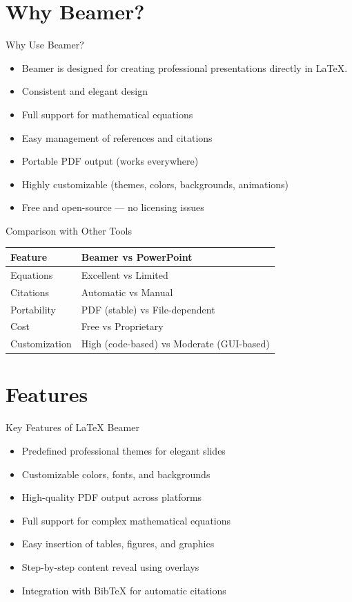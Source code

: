 \documentclass[10pt]{beamer}
\theoremstyle{definition}
\begin{document}
	\section{Why Beamer?}
	\begin{frame}{Why Use Beamer?}
		\begin{itemize}[<+->]
			\item Beamer is designed for creating professional presentations directly in \LaTeX{}.
			\item Consistent and elegant design
			\item Full support for mathematical equations
			\item Easy management of references and citations
			\item Portable PDF output (works everywhere)
			\item Highly customizable (themes, colors, backgrounds, animations)
			\item Free and open-source — no licensing issues
		\end{itemize}
	\end{frame}
	
	\begin{frame}{Comparison with Other Tools}
		\begin{tabular}{p{} p{}}
			\toprule
			Feature & Beamer vs PowerPoint\\\midrule
			Equations & Excellent vs Limited\\
			Citations & Automatic vs Manual\\
			Portability & PDF (stable) vs File-dependent\\
			Cost & Free vs Proprietary\\
			Customization & High (code-based) vs Moderate (GUI-based)\\\bottomrule
		\end{tabular}
	\end{frame}
	
	\section{Features}
	\begin{frame}{Key Features of \LaTeX{} Beamer}
		\begin{itemize}[<+->]
			\item Predefined professional themes for elegant slides
			\item Customizable colors, fonts, and backgrounds
			\item High-quality PDF output across platforms
			\item Full support for complex mathematical equations
			\item Easy insertion of tables, figures, and graphics
			\item Step-by-step content reveal using overlays
			\item Integration with BibTeX for automatic citations
		\end{itemize}
	\end{frame}
	
\end{document}
